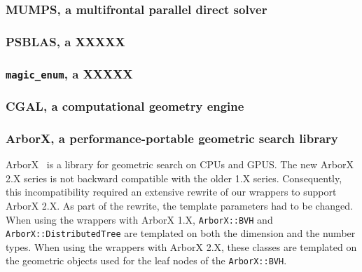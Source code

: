 \documentclass{ansarticle-preprint}
\begin{document}
\subsubsection{MUMPS, a multifrontal parallel direct solver}


\subsubsection{PSBLAS, a XXXXX}



\subsubsection{\texttt{magic\_enum}, a XXXXX}


\subsubsection{CGAL, a computational geometry engine}


\subsubsection{ArborX, a performance-portable geometric search library}
ArborX~\cite{prokopenko2025} is a library for geometric search on CPUs and GPUS.
The new ArborX 2.X series is not backward compatible with the older 1.X series.
Consequently, this incompatibility required an extensive rewrite of our wrappers to
support ArborX 2.X. As part of the rewrite, the template parameters had to
be changed. When using the wrappers with ArborX 1.X, \texttt{ArborX::BVH}
and \texttt{ArborX::DistributedTree} are templated on both the dimension and
the number types. When using the wrappers with ArborX 2.X, these classes are
templated on the geometric objects used for the leaf nodes of the
\texttt{ArborX::BVH}.
\end{document}
